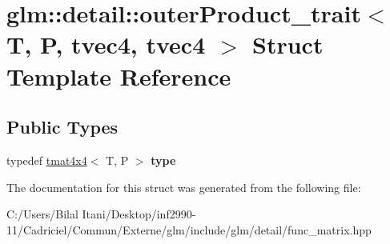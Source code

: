 \hypertarget{structglm_1_1detail_1_1outer_product__trait_3_01_t_00_01_p_00_01tvec4_00_01tvec4_01_4}{}\section{glm\+:\+:detail\+:\+:outer\+Product\+\_\+trait$<$ T, P, tvec4, tvec4 $>$ Struct Template Reference}
\label{structglm_1_1detail_1_1outer_product__trait_3_01_t_00_01_p_00_01tvec4_00_01tvec4_01_4}
\subsection*{Public Types}
\begin{DoxyCompactItemize}
\item 
typedef \hyperlink{structglm_1_1detail_1_1tmat4x4}{tmat4x4}$<$ T, P $>$ {\bfseries type}\hypertarget{structglm_1_1detail_1_1outer_product__trait_3_01_t_00_01_p_00_01tvec4_00_01tvec4_01_4_a89f0d2b33be6604293d1373176291811}{}\label{structglm_1_1detail_1_1outer_product__trait_3_01_t_00_01_p_00_01tvec4_00_01tvec4_01_4_a89f0d2b33be6604293d1373176291811}

\end{DoxyCompactItemize}


The documentation for this struct was generated from the following file\+:\begin{DoxyCompactItemize}
\item 
C\+:/\+Users/\+Bilal Itani/\+Desktop/inf2990-\/11/\+Cadriciel/\+Commun/\+Externe/glm/include/glm/detail/func\+\_\+matrix.\+hpp\end{DoxyCompactItemize}
